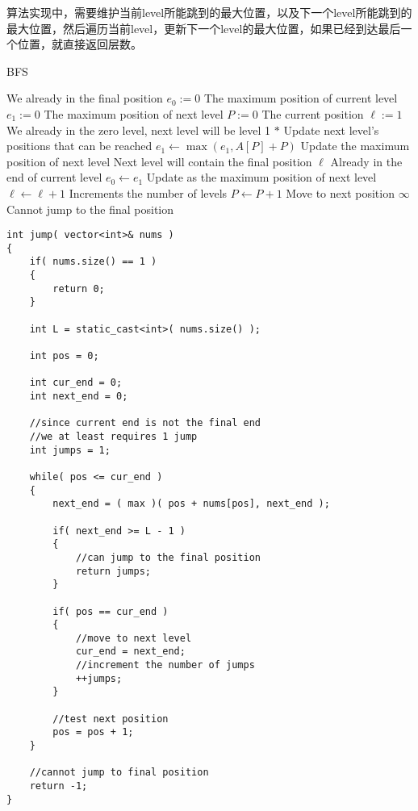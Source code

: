 算法实现中，需要维护当前level所能跳到的最大位置，以及下一个level所能跳到的最大位置，然后遍历当前level，更新下一个level的最大位置，如果已经到达最后一个位置，就直接返回层数。

\setcounter{algorithm}{0}
\begin{algorithm}[H]
\caption{BFS}
\begin{algorithmic}[1]
\State {} \Comment We already in the final position
\EndIf
\State $e_0 := 0$ \Comment The maximum position of current level
\State $e_1 := 0$ \Comment The maximum position of next level
\State $P:=0$ \Comment The current position
\State $\ell := 1$ \Comment We already in the zero level, next level will be level 1
\State $\ast$ Update next level's positions that can be reached
\State $e_1 \gets \max(e_1, A[P]+P)$ \Comment Update the maximum position of next level
 \Comment Next level will contain the final position
\State \Return $\ell$
\EndIf
{} \Comment Already in the end of current level
\State $e_0 \gets e_1$ \Comment Update as the maximum position of next level
\State $\ell\gets \ell+1$ \Comment Increments the number of levels
\EndIf
\State $P \gets P+1$ \Comment Move to next position
\EndWhile
\State \Return $\infty$ \Comment Cannot jump to the final position
\EndProcedure
\end{algorithmic}
\end{algorithm}

\setcounter{lstlisting}{0}
\begin{lstlisting}[style=customc, caption={BFS}]
int jump( vector<int>& nums )
{
    if( nums.size() == 1 )
    {
        return 0;
    }

    int L = static_cast<int>( nums.size() );

    int pos = 0;

    int cur_end = 0;
    int next_end = 0;

    //since current end is not the final end
    //we at least requires 1 jump
    int jumps = 1;

    while( pos <= cur_end )
    {
        next_end = ( max )( pos + nums[pos], next_end );

        if( next_end >= L - 1 )
        {
            //can jump to the final position
            return jumps;
        }

        if( pos == cur_end )
        {
            //move to next level
            cur_end = next_end;
            //increment the number of jumps
            ++jumps;
        }

        //test next position
        pos = pos + 1;
    }

    //cannot jump to final position
    return -1;
}
\end{lstlisting}